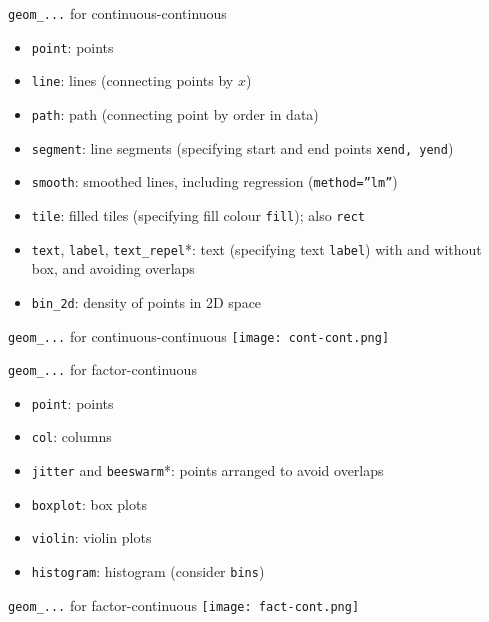 \documentclass[10pt]{beamer}
\begin{document}
\begin{frame}{\texttt{geom\_...} for continuous-continuous}
    \begin{itemize}
    \item \texttt{point}: points
    \item \texttt{line}: lines (connecting points by $x$)
       \item \texttt{path}: path (connecting point by order in data)
        \item \texttt{segment}: line segments (specifying start and end points \texttt{xend, yend})
       \item \texttt{smooth}: smoothed lines, including regression (\texttt{method=''lm''})
             \item \texttt{tile}: filled tiles (specifying fill colour \texttt{fill}); also \texttt{rect}
               \item \texttt{text}, \texttt{label}, \texttt{text\_repel}*: text (specifying text \texttt{label}) with and without box, and avoiding overlaps
                 \item \texttt{bin\_2d}: density of points in 2D space
               \end{itemize}
\end{frame}


\begin{frame}{\texttt{geom\_...} for continuous-continuous}
  \texttt{[image: cont-cont.png]}
\end{frame}

\begin{frame}{\texttt{geom\_...} for factor-continuous}
    \begin{itemize}
    \item \texttt{point}: points
      \item \texttt{col}: columns
    \item \texttt{jitter} and \texttt{beeswarm}*: points arranged to avoid overlaps
       \item \texttt{boxplot}: box plots
             \item \texttt{violin}: violin plots
    \item \texttt{histogram}: histogram (consider \texttt{bins})
              \end{itemize}
\end{frame}

\begin{frame}{\texttt{geom\_...} for factor-continuous}
  \texttt{[image: fact-cont.png]}
\end{frame}
\end{document}
